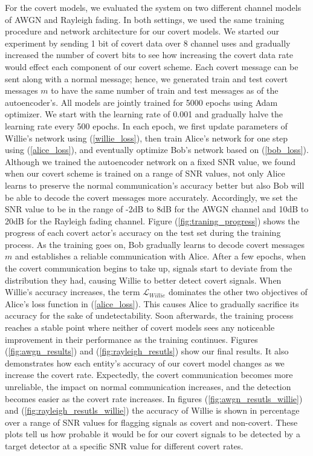 For the covert models, we evaluated the system on two different channel models of AWGN and Rayleigh fading. In both settings, we used the same training procedure and network architecture for our covert models. We started our experiment by sending 1 bit of covert data over 8 channel uses and gradually increased the number of covert bits to see how increasing the covert data rate would effect each component of our covert scheme. Each covert message can be sent along with a normal message; hence, we generated train and test covert messages \(m\) to have the same number of train and test messages as of the autoencoder's. All models are jointly trained for 5000 epochs using Adam optimizer. We start with the learning rate of 0.001 and gradually halve the learning rate every 500 epochs. In each epoch, we first update parameters of Willie's network using (\ref{willie_loss}), then train Alice's network for one step using (\ref{alice_loss}), and eventually optimize Bob's network based on (\ref{bob_loss}). Although we trained the autoencoder network on a fixed SNR value, we found when our covert scheme is trained on a range of SNR values, not only Alice learns to preserve the normal communication's accuracy better but also Bob will be able to decode the covert messages more accurately. Accordingly, we set the SNR value to be in the range of -2dB to 8dB for the AWGN channel and 10dB to 20dB for the Rayleigh fading channel.
Figure (\ref{fig:traning_progress}) shows the progress of each covert actor's accuracy on the test set during the training process. As the training goes on, Bob gradually learns to decode covert messages \(m\) and establishes a reliable communication with Alice. After a few epochs, when the covert communication begins to take up, signals start to deviate from the distribution they had, causing Willie to better detect covert signals. When Willie's accuracy increases, the term \(\mathcal{L}_{Willie}\) dominates the other two objectives of Alice's loss function in (\ref{alice_loss}). This causes Alice to gradually sacrifice its accuracy for the sake of undetectability. Soon afterwards, the training process reaches a stable point where neither of covert models sees any noticeable improvement in their performance as the training continues. Figures (\ref{fig:awgn_results}) and (\ref{fig:rayleigh_resutls}) show our final results. It also demonstrates how each entity's accuracy of our covert model changes as we increase the covert rate. Expectedly, the covert communication becomes more unreliable, the impact on normal communication increases, and the detection becomes easier as the covert rate increases. In figures (\ref{fig:awgn_resutls_willie}) and (\ref{fig:rayleigh_resutls_willie}) the accuracy of Willie is shown in percentage over a range of SNR values for flagging signals as covert and non-covert. These plots tell us how probable it would be for our covert signals to be detected by a target detector at a specific SNR value for different covert rates.\\
